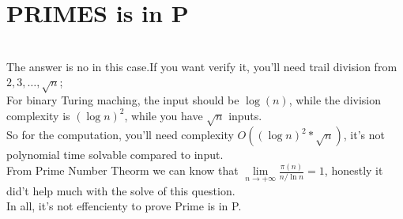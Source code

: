 \documentclass{article}
\begin{document}
\section{PRIMES is in P}
\\The answer is no in this case.If you want verify it, you'll need trail division from $2,3, \dots, \sqrt{n} $;
\\For binary Turing maching, the input should be $\log(n)$, while the division complexity is $(\log n)^2$, while you have $\sqrt{n}$ inputs.
\\So for the computation, you'll need complexity $O ((\log n)^2*\sqrt{n})$, it's not polynomial time solvable compared to input.
\\From Prime Number Theorm we can know that $\lim\limits_{n\to+\infty}\frac{\pi (n)}{n/\ln n} = 1$, honestly it did't help much with the solve of this question.
\\In all, it's not effencienty to prove Prime is in P.
\end{document}
